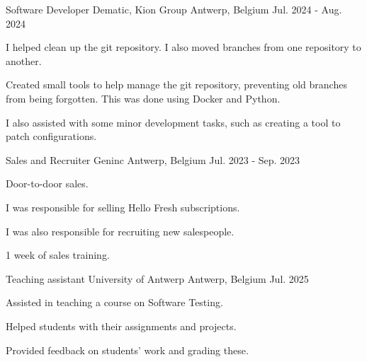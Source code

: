 
\begin{cventries}

    \cventry
      {Software Developer} %
      {Dematic, Kion Group} %
      {Antwerp, Belgium} %
      {Jul. 2024 - Aug. 2024} %
      {
        \begin{cvitems} %
          \item {I helped clean up the git repository. I also moved branches from one repository to another.}
          \item {Created small tools to help manage the git repository, preventing old branches from being forgotten. This was done using Docker and Python.}
          \item {I also assisted with some minor development tasks, such as creating a tool to patch configurations.}
        \end{cvitems}
      }

    \cventry
      {Sales and Recruiter} %
      {Geninc} %
      {Antwerp, Belgium} %
      {Jul. 2023 - Sep. 2023} %
      {
        \begin{cvitems} %
          \item {Door-to-door sales.}
          \item {I was responsible for selling Hello Fresh subscriptions.}
          \item {I was also responsible for recruiting new salespeople.}
          \item {1 week of sales training.}
        \end{cvitems}
      }

    \cventry
      {Teaching assistant} %
      {University of Antwerp} %
      {Antwerp, Belgium} %
      {Jul. 2025} %
      {
        \begin{cvitems} %
          \item {Assisted in teaching a course on Software Testing.}
          \item {Helped students with their assignments and projects.}
          \item {Provided feedback on students' work and grading these.}
        \end{cvitems}
      }

\end{cventries}
